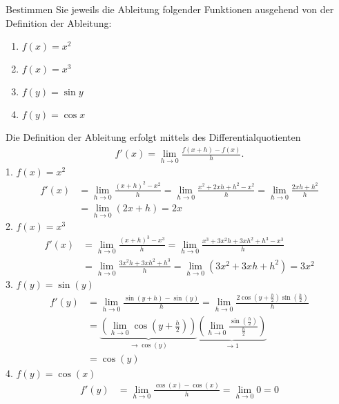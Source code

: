 \documentclass[11pt,answers]{exam}
\begin{document}
\begin{questions}
Bestimmen Sie jeweils die Ableitung folgender Funktionen ausgehend von der Definition der Ableitung:\\
\parbox{0.5\textwidth}{\begin{enumerate}
\item $f(x)=x^2$
\item $f(x)=x^3$
\end{enumerate}}\parbox{0.5\textwidth}{\begin{enumerate}\setcounter{enumi}{2}
\item $f(y)=\sin y$
\item $f(y)=\cos x$
\end{enumerate}}
\begin{solution} Die Definition der Ableitung erfolgt mittels des Differentialquotienten
\begin{align*}
f'(x)=\lim_{h\to 0}\frac{f(x+h)-f(x)}{h}.
\end{align*}
1. $f(x)=x^2$
\begin{align*}
f'(x)
&=\lim_{h\to 0}\frac{(x+h)^2-x^2}{h}
=\lim_{h\to 0}\frac{x^2+2xh+h^2-x^2}{h}
=\lim_{h\to 0}\frac{2xh+h^2}{h}
\\
&
=\lim_{h\to 0}(2x+h)=2x
\end{align*}
2. $f(x)=x^3$
\begin{align*}
f'(x)
&=\lim_{h\to 0}\frac{(x+h)^3-x^3}{h}
=\lim_{h\to 0}\frac{x^3+3x^2h+3xh^2+h^3-x^3}{h}
\\
&
=\lim_{h\to 0}\frac{3x^2h+3xh^2+h^3}{h}
=\lim_{h\to 0}(3x^2+3xh+h^2)=3x^2
\end{align*}
3. $f(y)=\sin(y)$
\begin{align*}
f'(y)
&=\lim_{h\to 0}\frac{\sin(y+h)-\sin(y)}{h}
=\lim_{h\to 0}\frac{2\cos\left(y+\frac{h}{2}\right)\sin\left(\frac{h}{2}\right)}{h}
\\
&
=
\underbrace{\left(\lim_{h\to 0}\cos\left(y+\frac{h}{2}\right)\right)}_{\to\cos(y)}
\underbrace{\left(\lim_{h\to 0}\frac{\sin\left(\frac{h}{2}\right)}{\frac{h}{2}}\right)}_{\to 1}
\\
&=
\cos(y)
\end{align*}
4. $f(y)=\cos(x)$
\begin{align*}
f'(y)
&=\lim_{h\to 0}\frac{\cos(x)-\cos(x)}{h}
=\lim_{h\to 0}0 =0
\end{align*}
\end{solution}





\end{questions}
\end{document}
